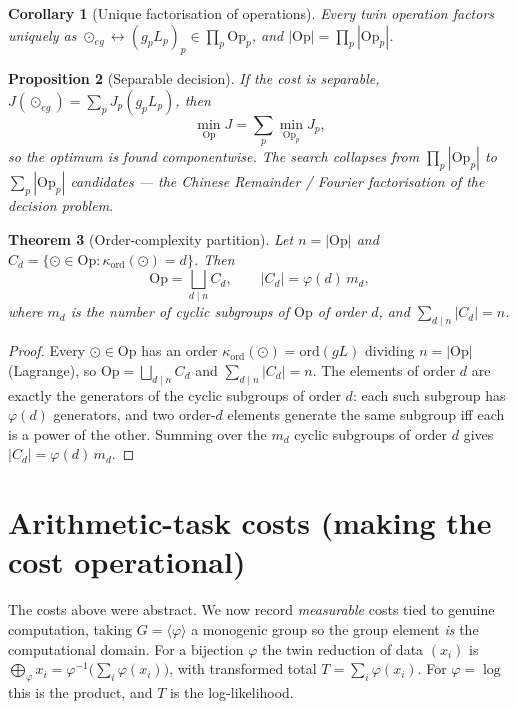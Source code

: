 \documentclass[11pt,a4paper]{article}
\newcommand{\Op}{\mathrm{Op}}
\theoremstyle{plain}
\newtheorem{theorem}{Theorem}
\newtheorem{proposition}[theorem]{Proposition}
\newtheorem{corollary}[theorem]{Corollary}
\theoremstyle{definition}
\theoremstyle{remark}
\begin{document}
\begin{corollary}[Unique factorisation of operations]\label{cor:crt}
Every twin operation factors uniquely as $\odot_{eg}\leftrightarrow (g_pL_p)_p
\in\prod_p\Op_p$, and $|\Op|=\prod_p|\Op_p|$.
\end{corollary}

\begin{proposition}[Separable decision]\label{prop:separable}
If the cost is separable, $J(\odot_{eg})=\sum_p J_p(g_pL_p)$, then
\[
\min_{\Op} J = \sum_p \min_{\Op_p} J_p,
\]
so the optimum is found componentwise. The search collapses from
$\prod_p|\Op_p|$ to $\sum_p|\Op_p|$ candidates --- the Chinese Remainder /
Fourier factorisation of the decision problem.
\end{proposition}

\begin{theorem}[Order-complexity partition]\label{thm:complexity}
Let $n=|\Op|$ and $C_d=\{\odot\in\Op:\kappa_{\mathrm{ord}}(\odot)=d\}$. Then
\[
\Op=\bigsqcup_{d\mid n} C_d, \qquad |C_d|=\varphi(d)\,m_d,
\]
where $m_d$ is the number of cyclic subgroups of $\Op$ of order $d$, and
$\sum_{d\mid n}|C_d|=n$.
\end{theorem}

\begin{proof}
Every $\odot\in\Op$ has an order $\kappa_{\mathrm{ord}}(\odot)=\mathrm{ord}(gL)$ dividing $n=|\Op|$ (Lagrange), so
$\Op=\bigsqcup_{d\mid n}C_d$ and $\sum_{d\mid n}|C_d|=n$. The elements of order $d$ are exactly the generators of
the cyclic subgroups of order $d$: each such subgroup has $\varphi(d)$ generators, and two order-$d$ elements
generate the same subgroup iff each is a power of the other. Summing over the $m_d$ cyclic subgroups of order $d$
gives $|C_d|=\varphi(d)\,m_d$.
\end{proof}

\section{Arithmetic-task costs (making the cost operational)}

The costs above were abstract. We now record \emph{measurable} costs tied to
genuine computation, taking $G=\langle\varphi\rangle$ a monogenic group so the
group element \emph{is} the computational domain. For a bijection $\varphi$ the
twin reduction of data $(x_i)$ is
$\bigoplus_\varphi x_i = \varphi^{-1}\!\bigl(\sum_i\varphi(x_i)\bigr)$, with
transformed total $T=\sum_i\varphi(x_i)$. For $\varphi=\log$ this is the
product, and $T$ is the log-likelihood.
\end{document}
